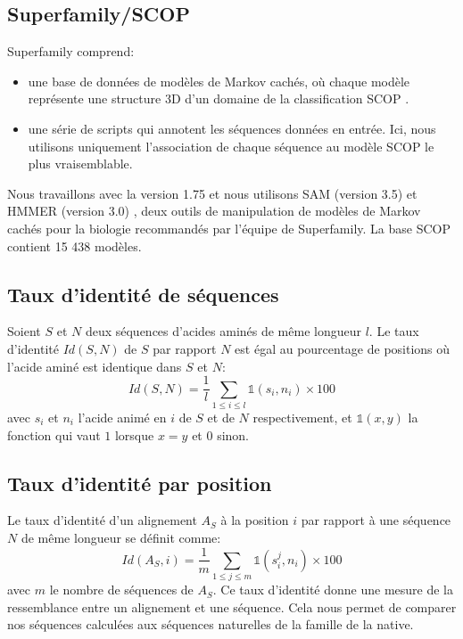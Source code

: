 \subsection{Superfamily/SCOP}
\label{sec:Superfamily}
Superfamily \cite{Madera04} comprend: 
\begin{itemize}
\item une base de données de modèles de Markov cachés, où chaque modèle représente une structure 3D d'un domaine de la classification SCOP \cite{Andreeva04}.
\item une série de scripts qui annotent les séquences données en entrée. Ici, nous utilisons uniquement l'association de chaque séquence au modèle SCOP le plus vraisemblable. 
\end{itemize}
Nous travaillons avec la version 1.75 et nous utilisons SAM (version 3.5) \cite{hughey95} et HMMER (version 3.0) \cite{HMMER}, deux outils de manipulation de modèles de Markov cachés pour la biologie recommandés par l'équipe de Superfamily. La base SCOP contient 15 438 modèles.

\subsection{Taux d'identité de séquences}

Soient $S$ et $N$ deux séquences d'acides aminés de même longueur $l$. Le taux d'identité $Id(S,N)$ de $S$ par rapport $N$ est égal au pourcentage de positions où l'acide aminé est identique dans $S$ et $N$:
\begin{equation}
Id(S,N) =\frac{1}{l}\sum_{1 \leqslant i \leqslant l} \mathds{1}(s_i,n_i) \times 100
\end{equation}
avec $s_i$ et $n_i$ l'acide animé en $i$ de $S$ et de $N$ respectivement, et $\mathds{1}(x,y)$ la fonction qui vaut $1$ lorsque $x=y$ et $0$ sinon. 
\subsection{Taux d'identité par position}
\label{TauxID}
Le taux d'identité d'un alignement $A_S$ à la position $i$ par rapport à une séquence $N$ de même longueur se définit comme:
\begin{equation}
Id(A_{S},i) = \frac{1}{m}\sum_{1\leqslant j \leqslant m} \mathds{1}(s_i^j,n_i) \times 100
\end{equation}
avec $m$ le nombre de séquences de $A_S$. Ce taux d'identité donne une mesure de la ressemblance entre un alignement et une séquence. Cela nous permet de comparer nos séquences calculées aux séquences naturelles de la famille de la native.  
